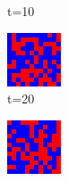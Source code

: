 \documentclass[a4paper, 11pt]{article}
\begin{document}
\begin{figure}[H]
\begin{subfigure}{.25\textwidth}
  \caption{t=10}
\end{subfigure}
\begin{subfigure}{.25\textwidth}
  \centering
  \includegraphics[width=0.9\linewidth]{SNOWDRIFT_MOORE_12x12_t20}
  \caption{t=20}
\end{subfigure}%
\begin{subfigure}{.25\textwidth}
  \centering
  \includegraphics[width=0.9\linewidth]{SNOWDRIFT_MOORE_12x12_t50}

\end{subfigure}
\end{figure}
\end{document}
